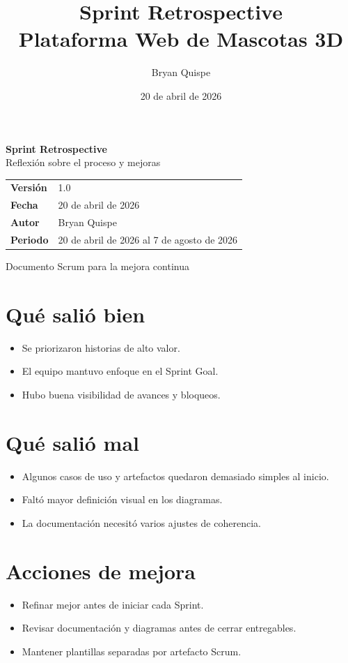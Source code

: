 \documentclass[12pt,a4paper]{article}
\title{\Huge\textbf{Sprint Retrospective}\\[0.3em]\Large Plataforma Web de Mascotas 3D}
\author{Bryan Quispe}
\date{20 de abril de 2026}
\begin{document}
\begin{titlepage}
\centering
\vspace*{1.8cm}
{\Huge\bfseries\color{PrimaryBlue} Sprint Retrospective\\[0.35em]}
{\LARGE Reflexión sobre el proceso y mejoras\\[1.2cm]}

\begin{tabular}{p{5cm} p{8cm}}
\rowcolor{SoftGray}
\textbf{Versión} & 1.0 \\
\textbf{Fecha} & 20 de abril de 2026 \\
\textbf{Autor} & Bryan Quispe \\
\textbf{Periodo} & 20 de abril de 2026 al 7 de agosto de 2026 \\
\end{tabular}

\vfill
{\large Documento Scrum para la mejora continua}
\end{titlepage}

\section{Qué salió bien}
\begin{itemize}[leftmargin=*]
    \item Se priorizaron historias de alto valor.
    \item El equipo mantuvo enfoque en el Sprint Goal.
    \item Hubo buena visibilidad de avances y bloqueos.
\end{itemize}

\section{Qué salió mal}
\begin{itemize}[leftmargin=*]
    \item Algunos casos de uso y artefactos quedaron demasiado simples al inicio.
    \item Faltó mayor definición visual en los diagramas.
    \item La documentación necesitó varios ajustes de coherencia.
\end{itemize}

\section{Acciones de mejora}
\begin{itemize}[leftmargin=*]
    \item Refinar mejor antes de iniciar cada Sprint.
    \item Revisar documentación y diagramas antes de cerrar entregables.
    \item Mantener plantillas separadas por artefacto Scrum.
\end{itemize}
\end{document}
